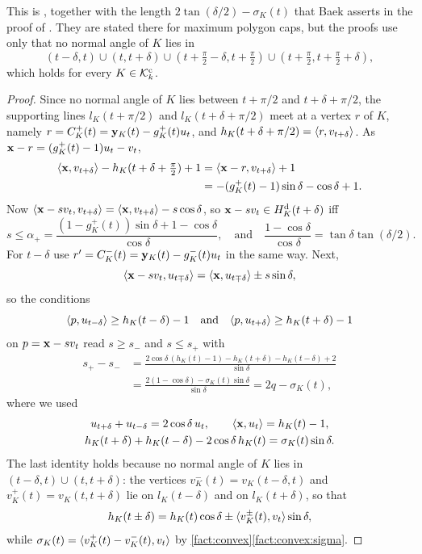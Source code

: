 This is , together with the length
$2\tan(\delta/2)-\sigma_K(t)$ that Baek asserts in the proof of
. They are stated there for maximum polygon caps, but the
proofs use only that no normal angle of $K$ lies in
\[
  (t-\delta,t)\cup(t,t+\delta)\cup(t+\tfrac\pi2-\delta,t+\tfrac\pi2)
  \cup(t+\tfrac\pi2,t+\tfrac\pi2+\delta),
\]
which holds for every $K\in\mathcal{K}^{\mathrm{c}}_k$.

\begin{proof}
Since no normal angle of $K$ lies between $t+\pi/2$ and $t+\delta+\pi/2$, the
supporting lines $l_K(t+\pi/2)$ and $l_K(t+\delta+\pi/2)$ meet at a vertex $r$
of $K$, namely $r=C_K^+(t)=\mathbf{y}_K(t)-g_K^+(t)u_t$, and $h_K(t+\delta+\pi/2)=\langle r,v_{t+\delta}\rangle$. As $\mathbf{x}-r=(g_K^+(t)-1)u_t-v_t$,
\begin{align*}
  \langle \mathbf{x},v_{t+\delta}\rangle-h_K(t+\delta+\tfrac\pi2)+1&=\langle \mathbf{x}-r,v_{t+\delta}\rangle
    +1\\
  &=-(g_K^+(t)-1)\sin\delta-\cos\delta+1 .
\end{align*}
Now $\langle \mathbf{x}-sv_t,v_{t+\delta}\rangle=\langle \mathbf{x},v_{t+\delta}\rangle-s\cos\delta$, so
$\mathbf{x}-sv_t\in H^{\mathrm d}_K(t+\delta)$ iff
\[
  s\le\alpha_+=\frac{(1-g_K^+(t))\sin\delta+1-\cos\delta}{\cos\delta},
  \quad\text{and}\quad\frac{1-\cos\delta}{\cos\delta}=\tan\delta\tan(\delta/2).
\]
For $t-\delta$ use $r'=C_K^-(t)=\mathbf{y}_K(t)-g_K^-(t)u_t$ in the same way. Next,
\[
  \langle \mathbf{x}-sv_t,u_{t\mp\delta}\rangle=\langle \mathbf{x},u_{t\mp\delta}\rangle\pm s\sin\delta,
\]
so the conditions
\[
  \langle p,u_{t-\delta}\rangle\ge h_K(t-\delta)-1\quad\text{and}\quad
  \langle p,u_{t+\delta}\rangle\ge h_K(t+\delta)-1
\]
on $p=\mathbf{x}-sv_t$ read $s\ge s_-$ and $s\le s_+$ with
\begin{align*}
  s_+-s_-&=\frac{2\cos\delta\,(h_K(t)-1)-h_K(t+\delta)-h_K(t-\delta)+2}{\sin\delta}\\
  &=\frac{2(1-\cos\delta)-\sigma_K(t)\sin\delta}{\sin\delta}=2q-\sigma_K(t),
\end{align*}
where we used
\begin{gather*}
  u_{t+\delta}+u_{t-\delta}=2\cos\delta\,u_t,\qquad\langle \mathbf{x},u_t\rangle=h_K(t)-1,\\
  h_K(t+\delta)+h_K(t-\delta)-2\cos\delta\,h_K(t)=\sigma_K(t)\sin\delta.
\end{gather*}
The last identity holds because no normal angle of $K$ lies in
$(t-\delta,t)\cup(t,t+\delta)$: the vertices $v_K^-(t)=v_K(t-\delta,t)$ and
$v_K^+(t)=v_K(t,t+\delta)$ lie on $l_K(t-\delta)$ and on $l_K(t+\delta)$, so
that
\[
  h_K(t\pm\delta)=h_K(t)\cos\delta\pm\langle v_K^\pm(t),v_t\rangle\sin\delta,
\]
while $\sigma_K(t)=\langle v_K^+(t)-v_K^-(t),v_t\rangle$ by
\cref{fact:convex}\ref{fact:convex:sigma}.
\end{proof}

